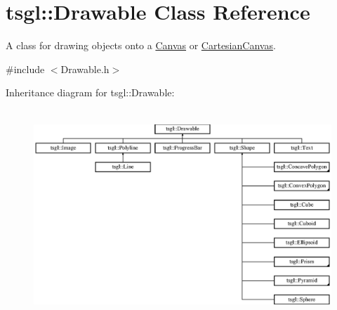 \hypertarget{classtsgl_1_1_drawable}{}\section{tsgl\+:\+:Drawable Class Reference}
\label{classtsgl_1_1_drawable}


A class for drawing objects onto a \hyperlink{classtsgl_1_1_canvas}{Canvas} or \hyperlink{classtsgl_1_1_cartesian_canvas}{Cartesian\+Canvas}.  




{\ttfamily \#include $<$Drawable.\+h$>$}

Inheritance diagram for tsgl\+:\+:Drawable\+:\begin{figure}[H]
\begin{center}
\leavevmode
\includegraphics[height=7.887324cm]{classtsgl_1_1_drawable}
\end{center}
\end{figure}
